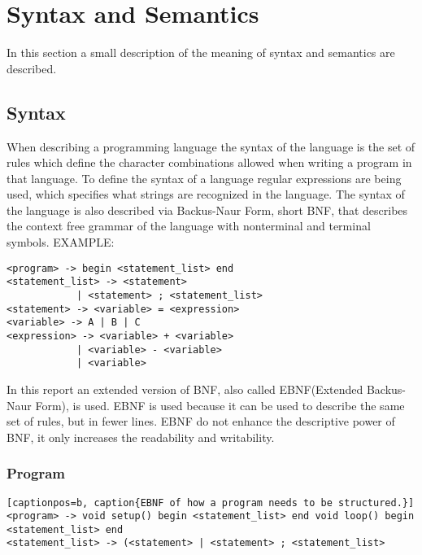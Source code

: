 \chapter{Syntax and Semantics}\label{analysis:syntax-and-semantics}
In this section a small description of the meaning of syntax and semantics are described.

\section{Syntax}
When describing a programming language the syntax of the language is the set of rules which define the character combinations allowed when writing a program in that language. To define the syntax of a language regular expressions are being used, which specifies what strings are recognized in the language. The syntax of the language is also described via Backus-Naur Form, short BNF, that describes the context free grammar of the language with nonterminal and terminal symbols.
EXAMPLE: \\
\begin{lstlisting}
<program> -> begin <statement_list> end
<statement_list> -> <statement>
			| <statement> ; <statement_list>
<statement> -> <variable> = <expression>
<variable> -> A | B | C
<expression> -> <variable> + <variable>
			| <variable> - <variable>
			| <variable>
\end{lstlisting}

In this report an extended version of BNF, also called EBNF(Extended Backus-Naur Form), is used. EBNF is used because it can be used to describe the same set of rules, but in fewer lines. EBNF  do not enhance the descriptive power of BNF, it only increases the readability and writability.

\subsection{Program}
\begin{lstlisting}[captionpos=b, caption{EBNF of how a program needs to be structured.}]
<program> -> void setup() begin <statement_list> end void loop() begin <statement_list> end
<statement_list> -> (<statement> | <statement> ; <statement_list>
\end{lstlisting}

